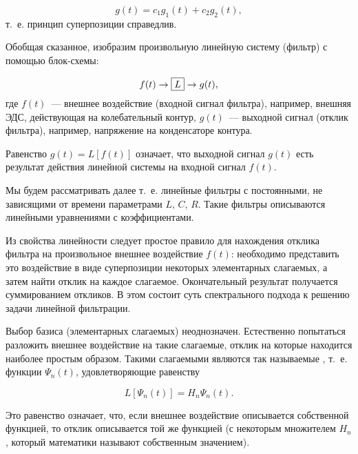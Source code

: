 \begin{equation*}
    g(t)=c_1g_1(t)+c_2g_2(t),
\end{equation*}
т.~е. принцип суперпозиции справедлив.

Обобщая сказанное, изобразим произвольную линейную систему (фильтр) с помощью
блок-схемы:

\begin{equation*}
    f(t)\to\fbox{$L$} \to g(t),
\end{equation*}
где $f(t)$~--- внешнее воздействие (входной сигнал фильтра), например, внешняя
ЭДС, действующая на колебательный контур,
$g(t)$~--- выходной сигнал (отклик фильтра), например, напряжение на
конденсаторе контура.

Равенство $g(t)=L[f(t)]$ означает, что выходной сигнал $g(t)$ есть результат
действия линейной системы на входной сигнал $f(t)$.


Мы будем рассматривать далее  т.~е.
линейные фильтры с постоянными, не зависящими от
времени параметрами $L$, $C$, $R$. Такие фильтры описываются линейными
уравнениями с  коэффициентами.

Из свойства линейности следует простое правило для нахождения отклика фильтра на
произвольное внешнее воздействие $f(t)$:
необходимо представить это воздействие в виде суперпозиции некоторых
элементарных слагаемых, а затем найти отклик на
каждое слагаемое. Окончательный результат получается суммированием откликов. В
этом состоит суть спектрального подхода к
решению задачи линейной фильтрации.

Выбор базиса (элементарных слагаемых) неоднозначен. Естественно попытаться
разложить внешнее воздействие на такие
слагаемые, отклик на которые находится наиболее простым образом. Такими
слагаемыми являются так называемые
, т.~е. функции $\Psi_n(t)$,
удовлетворяющие равенству

\begin{equation*}
    L[\Psi_n(t)]=H_n\Psi_n(t).
\end{equation*}

Это равенство означает, что, если внешнее воздействие описывается собственной
функцией, то отклик описывается той же
функцией (с некоторым множителем $H_n$, который математики называют собственным
значением).

